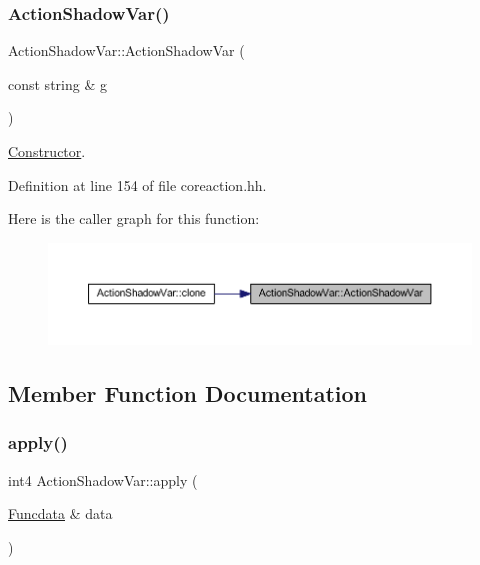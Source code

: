 \subsubsection{\texorpdfstring{ActionShadowVar()}{ActionShadowVar()}}
{\footnotesize\ttfamily Action\+Shadow\+Var\+::\+Action\+Shadow\+Var (\begin{DoxyParamCaption}\item[{const string \&}]{g }\end{DoxyParamCaption})\hspace{0.3cm}{\ttfamily [inline]}}



\mbox{\hyperlink{class_constructor}{Constructor}}. 



Definition at line 154 of file coreaction.\+hh.

Here is the caller graph for this function\+:
\nopagebreak
\begin{figure}[H]
\begin{center}
\leavevmode
\includegraphics[width=350pt]{class_action_shadow_var_aac99665ecb0ea99ece8161a5c3a3ff40_icgraph}
\end{center}
\end{figure}


\subsection{Member Function Documentation}
\mbox{\label{class_action_shadow_var_aac5164f51e21d4e76da14d7c2063c149}} 
\subsubsection{\texorpdfstring{apply()}{apply()}}
{\footnotesize\ttfamily int4 Action\+Shadow\+Var\+::apply (\begin{DoxyParamCaption}\item[{\mbox{\hyperlink{class_funcdata}{Funcdata}} \&}]{data }\end{DoxyParamCaption})\hspace{0.3cm}{\ttfamily [virtual]}}



